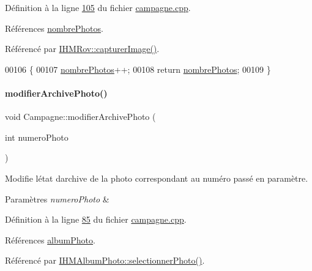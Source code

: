 Définition à la ligne \hyperlink{campagne_8cpp_source_l00105}{105} du fichier \hyperlink{campagne_8cpp_source}{campagne.\+cpp}.



Références \hyperlink{campagne_8h_source_l00048}{nombre\+Photos}.



Référencé par \hyperlink{ihmrov_8cpp_source_l00179}{I\+H\+M\+Rov\+::capturer\+Image()}.


\begin{DoxyCode}
00106 \{
00107     \hyperlink{class_campagne_a3696e02e3cefc30bf4f284152917718b}{nombrePhotos}++;
00108     \textcolor{keywordflow}{return} \hyperlink{class_campagne_a3696e02e3cefc30bf4f284152917718b}{nombrePhotos};
00109 \}
\end{DoxyCode}
\mbox{\label{class_campagne_a7751a5a0b5d1be46384f57b5409163e8}} 
\paragraph{\texorpdfstring{modifier\+Archive\+Photo()}{modifierArchivePhoto()}}
{\footnotesize\ttfamily void Campagne\+::modifier\+Archive\+Photo (\begin{DoxyParamCaption}\item[{int}]{numero\+Photo }\end{DoxyParamCaption})}



Modifie l\textquotesingle{}état d\textquotesingle{}archive de la photo correspondant au numéro passé en paramètre. 


\begin{DoxyParams}{Paramètres}
{\em numero\+Photo} & \\
\hline
\end{DoxyParams}


Définition à la ligne \hyperlink{campagne_8cpp_source_l00085}{85} du fichier \hyperlink{campagne_8cpp_source}{campagne.\+cpp}.



Références \hyperlink{campagne_8h_source_l00046}{album\+Photo}.



Référencé par \hyperlink{ihmalbumphoto_8cpp_source_l00081}{I\+H\+M\+Album\+Photo\+::selectionner\+Photo()}.


